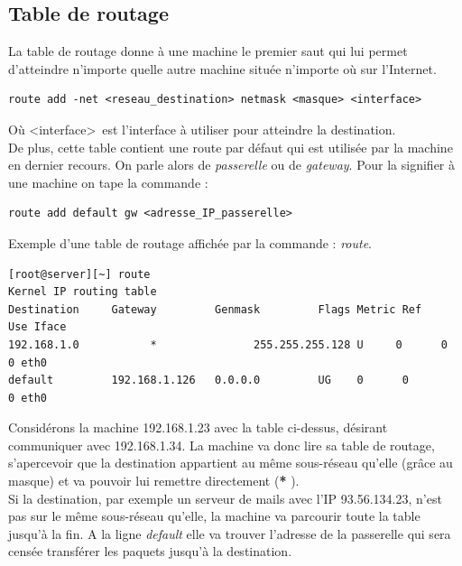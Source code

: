 \documentclass[12pt,a4paper,notitlepage]{article}
\begin{document}
\subsection{Table de routage}
La table de routage donne à une machine le premier saut qui lui permet d'atteindre n'importe quelle autre machine située n'importe où sur l'Internet. \\

\begin{lstlisting}
route add -net <reseau_destination> netmask <masque> <interface>
\end{lstlisting}
Où  \textless interface\textgreater\ est l'interface à utiliser pour atteindre la destination.\\

De plus, cette table contient une route par défaut qui est utilisée par la machine en dernier recours. On parle alors de \textit{passerelle} ou de \textit{gateway}. Pour la signifier à une machine on tape la commande : \\

\begin{lstlisting}
route add default gw <adresse_IP_passerelle>
\end{lstlisting}
\vspace{0.8cm}
Exemple d'une table de routage affichée par la commande : \textit{route}.
{\footnotesize \begin{verbatim}
[root@server][~] route                                                                                                                                  
Kernel IP routing table
Destination     Gateway         Genmask         Flags Metric Ref    Use Iface
192.168.1.0  		  *               255.255.255.128 U     0      0        0 eth0
default         192.168.1.126   0.0.0.0         UG    0      0        0 eth0

\end{verbatim}}

Considérons la machine 192.168.1.23 avec la table ci-dessus, désirant communiquer avec 192.168.1.34. La machine va donc lire sa table de routage, s'apercevoir que la destination appartient au même sous-réseau qu'elle (grâce au masque) et va pouvoir lui remettre directement (\og \textbf{*} \fg).\\

Si la destination, par exemple un serveur de mails avec l'IP 93.56.134.23, n'est pas sur le même sous-réseau qu'elle, la machine va parcourir toute la table jusqu'à la fin. A la ligne \textit{default} elle va trouver l'adresse de la passerelle qui sera censée transférer les paquets jusqu'à la destination.
\end{document}
